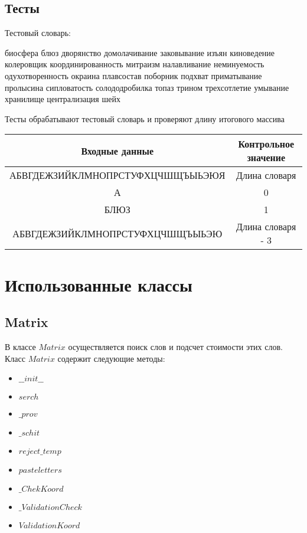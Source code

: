 \documentclass[a4paper,14pt]{article}
\begin{document}
	\subsection{Тесты}
	Тестовый словарь:
	
	биосфера блюз дворянство домолачивание заковывание изъян киноведение колеровщик координированность митраизм налавливание неминуемость одухотворенность окраина плавсостав поборник подхват приматывание пролысина сипловатость солододробилка топаз трином трехсотлетие умывание хранилище централизация шейх 

	Тесты обрабатывают тестовый словарь и проверяют длину итогового массива
	
	\begin{tabular}{|c|c|}
		\hline
		         Входные данные          & Контрольное значение \\ \hline
		АБВГДЕЖЗИЙКЛМНОПРСТУФХЦЧШЩЪЫЬЭЮЯ &    Длина словаря     \\ \hline
		               А                 &          0           \\ \hline
		              БЛЮЗ               &          1           \\ \hline
		АБВГДЕЖЗИЙКЛМНОПРСТУФХЦЧШЩЪЫЬЭЮ  &  Длина словаря - 3   \\ \hline
	\end{tabular}
	
\section{Использованные классы}
	\subsection{Matrix}
	В классе $Matrix$ осуществляется поиск слов и подсчет стоимости этих слов. Класс $Matrix$ содержит следующие методы: 
	
	\begin {itemize}
		\item$\_\_init\_\_$
		\item $serch$	
		
		\item $\_prov$
		\item $\_schit$
		\item $reject\_temp$
		
		\item $pasteletters$
		\item $\_ChekKoord$
		\item $\_ValidationCheck$	
		\item $ValidationKoord$
	\end {itemize}
	
\end{document}
